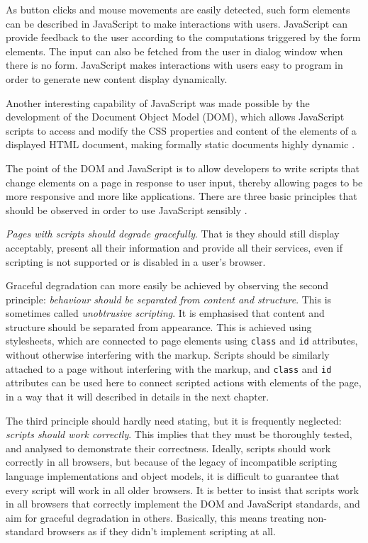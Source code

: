 As button clicks and mouse movements are easily detected, such form elements can be described in JavaScript to make interactions with users. JavaScript can provide feedback to the user according to the computations triggered by the form elements. The input can also be fetched from the user in dialog window when there is no form. JavaScript makes interactions with users easy to program in order to generate new content display dynamically.

Another interesting capability of JavaScript was made possible by the development of the Document Object Model (DOM), which allows JavaScript scripts to access and modify the CSS properties and content of the elements of a displayed HTML document, making formally static documents highly dynamic \cite{nicol2001document}.

The point of the DOM and JavaScript is to allow developers to write scripts that change elements on a page in response to user input, thereby allowing pages to be more responsive and more like applications. There are three basic principles that should be observed in order to use JavaScript sensibly \cite{bates2002web}.

\emph{Pages with scripts should degrade gracefully}. That is they should still display acceptably, present all their information and provide all their services, even if scripting is not supported or is disabled in a user's browser.

Graceful degradation can more easily be achieved by observing the second principle: \emph{behaviour should be separated from content and structure}. This is sometimes called \emph{unobtrusive scripting}. It is emphasised that content and structure should be separated from appearance. This is achieved using stylesheets, which are connected to page elements using \verb|class| and \verb|id| attributes, without otherwise interfering with the markup. Scripts should be similarly attached to a page without interfering with the markup, and \verb|class| and \verb|id| attributes can be used here to connect scripted actions with elements of the page, in a way that it will described in details in the next chapter.

The third principle should hardly need stating, but it is frequently neglected: \emph{scripts should work correctly}. This implies that they must be thoroughly tested, and analysed to demonstrate their correctness. Ideally, scripts should work correctly in all browsers, but because of the legacy of incompatible scripting language implementations and object models, it is difficult to guarantee that every script will work in all older browsers. It is better to insist that scripts work in all browsers that correctly implement the DOM and JavaScript standards, and aim for graceful degradation in others. Basically, this means treating non-standard browsers as if they didn't implement scripting at all.


